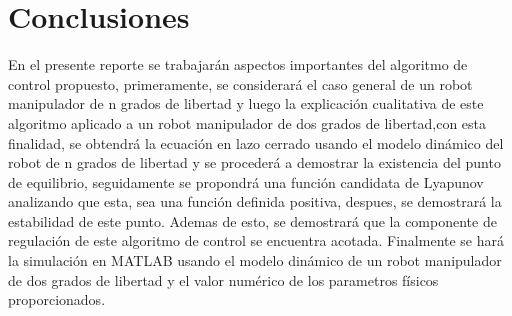 \documentclass[12pt]{article}
\begin{document}
\section{Conclusiones}
En el presente reporte se trabajarán aspectos importantes del algoritmo de control propuesto, primeramente, se considerará el caso general de un robot manipulador de n grados de libertad y luego la explicación cualitativa de este algoritmo aplicado a un robot manipulador de dos grados de libertad,con esta finalidad, se obtendrá la ecuación en lazo cerrado usando el modelo dinámico del robot de n grados de libertad y se procederá a demostrar la existencia del punto de equilibrio, seguidamente se propondrá una función candidata de Lyapunov analizando que esta, sea una función definida positiva, despues, se demostrará la estabilidad de este punto. Ademas de esto, se demostrará que la componente de regulación de este algoritmo de control se encuentra acotada. Finalmente se hará la simulación en MATLAB usando el modelo dinámico de un robot manipulador de dos grados de libertad y el valor numérico de los parametros físicos proporcionados.


\end{document}
